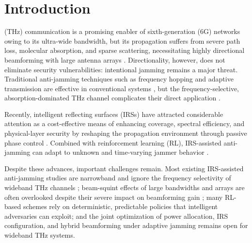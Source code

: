 \documentclass[10pt,conference]{IEEEtran}
\begin{document}
\section{Introduction}
\label{sec:intro}
 (THz) communication is a promising enabler of sixth-generation (6G) networks owing to its ultra-wide bandwidth, but its propagation suffers from severe path loss, molecular absorption, and sparse scattering, necessitating highly directional beamforming with large antenna arrays \cite{su2023wideband,yan2023beamforming}. Directionality, however, does not eliminate security vulnerabilities: intentional jamming remains a major threat. Traditional anti-jamming techniques such as frequency hopping and adaptive transmission are effective in conventional systems \cite{hanawal2016joint,xu2018jamming}, but the frequency-selective, absorption-dominated THz channel complicates their direct application \cite{akyildiz2022thz}.

Recently, intelligent reflecting surfaces (IRSs) have attracted considerable attention as a cost-effective means of enhancing coverage, spectral efficiency, and physical-layer security by reshaping the propagation environment through passive phase control \cite{wu2019intelligent,wu2021irs_survey,renzo2020smart}. Combined with reinforcement learning (RL), IRS-assisted anti-jamming can adapt to unknown and time-varying jammer behavior \cite{yang2021irs}.

Despite these advances, important challenges remain. Most existing IRS-assisted anti-jamming studies are narrowband and ignore the frequency selectivity of wideband THz channels \cite{yang2021irs}; beam-squint effects of large bandwidths and arrays are often overlooked despite their severe impact on beamforming gain \cite{su2023wideband,yan2023beamforming}; many RL-based schemes rely on deterministic, predictable policies that intelligent adversaries can exploit; and the joint optimization of power allocation, IRS configuration, and hybrid beamforming under adaptive jamming remains open for wideband THz systems.
\end{document}
